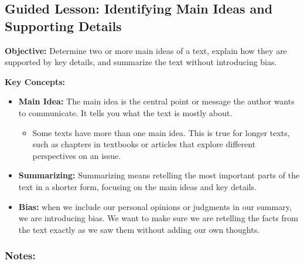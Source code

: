 \documentclass[12pt]{article}
\title{}
\date{}
\begin{document}
\subsection*{Guided Lesson: Identifying Main Ideas and Supporting Details}
\onehalfspacing

\begin{tcolorbox}[colframe=black!40, colback=gray!5, 
coltitle=black, colbacktitle=black!20, fonttitle=\bfseries\Large, 
title=Learning Objective, halign title=center, left=5pt, right=5pt, top=5pt, bottom=15pt]
\textbf{Objective:} Determine two or more main ideas of a text, explain how they are supported by key details, and summarize the text without introducing bias.
\end{tcolorbox}

\vspace{1em}

\begin{tcolorbox}[colframe=black!60, colback=white, 
coltitle=black, colbacktitle=black!15, fonttitle=\bfseries\Large, 
title=Key Concepts and Vocabulary, halign title=center, left=10pt, right=10pt, top=10pt, bottom=15pt]
\textbf{Key Concepts:}
\begin{itemize}
    \item \textbf{Main Idea:} The main idea is the central point or message the author wants to communicate. It tells you what the text is mostly about.
    \begin{itemize}
        \item Some texts have more than one main idea. This is true for longer texts, such as chapters in textbooks or articles that explore different perspectives on an issue.
    \end{itemize}
    \item \textbf{Summarizing:} Summarizing means retelling the most important parts of the text in a shorter form, focusing on the main ideas and key details.
    \item \textbf{Bias:} when we include our personal opinions or judgments in our summary, we are introducing bias. We want to make sure we are retelling the facts from the text exactly as we saw them without adding our own thoughts.
\end{itemize}

\end{tcolorbox}

\vspace{1em}

\subsubsection*{Notes:}
\noindent \underline{\hspace{17cm}} \\[1.2cm]
\noindent \underline{\hspace{17cm}} \\[1.2cm]
\noindent \underline{\hspace{17cm}} \\[1.2cm]
\end{document}
